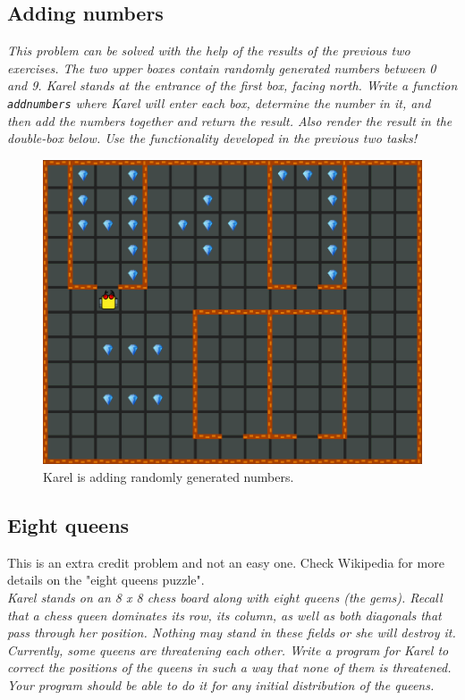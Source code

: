 {{\subsection{Adding numbers}

\noindent
{\em This problem can be solved with the help of the results 
of the previous two exercises.
The two upper boxes contain randomly generated numbers between 0 and 9. Karel stands at the entrance of the first box,
facing north. Write a function {\tt addnumbers} where Karel will enter each box, determine the number in it,
and then add the numbers together and return the result. Also render the result in the double-box below. 
Use the functionality developed in the previous two tasks!}


\begin{figure}[!ht]
\begin{center}
\includegraphics[height=0.4\textwidth]{img/i03.png}
\end{center}
\vspace{-4mm}
\caption{Karel is adding randomly generated numbers.}
\label{fig:g12}
\end{figure}




\subsection{Eight queens}

This is an extra credit problem and not an easy one. Check Wikipedia for 
more details on the "eight queens puzzle". \\

\noindent
{\em Karel stands on an 8 x 8 chess board along with eight queens (the gems). Recall that a chess queen dominates its row, its column, as well as both diagonals that pass through her position. Nothing may stand in these fields or she will destroy it. Currently, some queens are threatening each other. Write a program for Karel to correct the positions of the queens in such a way that none of them is threatened. Your program should be able to do it for any initial distribution of the queens. }

}}
